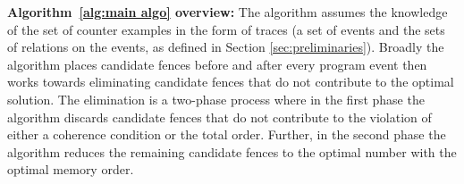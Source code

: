 \begin{algorithm}[h]
%		
%			
%		
%		
%		
%		
\end{algorithm}

\noindent
{\bf Algorithm~\ref{alg:main algo} overview:} 
The algorithm assumes the knowledge of the set of counter
examples in the form of traces (\ie a set of events and 
the sets of relations on the events, as defined in Section
\ref{sec:preliminaries}).
%
Broadly the algorithm places candidate fences before and
after every program event then works towards eliminating 
candidate
fences that do not contribute to the optimal solution.
%
The elimination is a two-phase process where in the first
phase the algorithm discards candidate fences that do not 
contribute to the violation of either a coherence condition 
or the \sc total order. 
Further, in the second phase the algorithm reduces the 
remaining candidate fences to the optimal number with
the optimal memory order.


